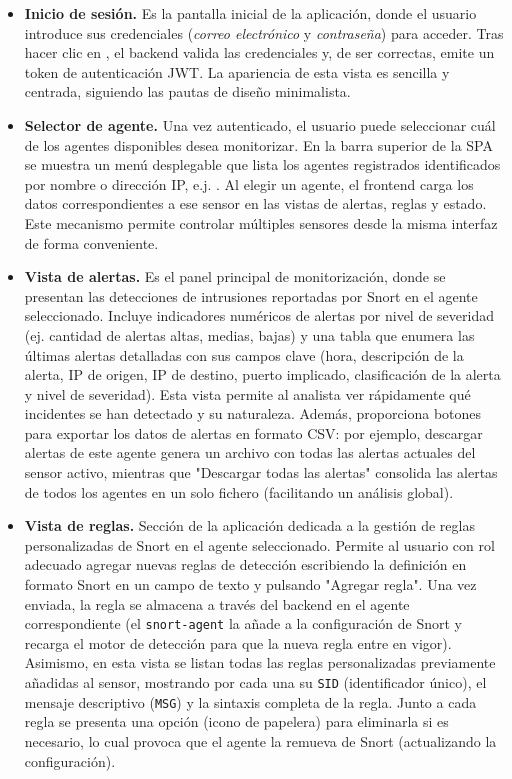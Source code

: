 \documentclass[11pt,a4paper,twoside]{report}
\begin{document}
\begin{itemize}
	\item \textbf{Inicio de sesión.} Es la pantalla inicial de la aplicación, donde el usuario introduce sus credenciales (\emph{correo electrónico} y \emph{contraseña}) para acceder. Tras hacer clic en , el backend valida las credenciales y, de ser correctas, emite un token de autenticación JWT. La apariencia de esta vista es sencilla y centrada, siguiendo las pautas de diseño minimalista.
	
	\item \textbf{Selector de agente.} Una vez autenticado, el usuario puede seleccionar cuál de los agentes disponibles desea monitorizar. En la barra superior de la SPA se muestra un menú desplegable que lista los agentes registrados identificados por nombre o dirección IP, e.j. . Al elegir un agente, el frontend carga los datos correspondientes a ese sensor en las vistas de alertas, reglas y estado. Este mecanismo permite controlar múltiples sensores desde la misma interfaz de forma conveniente.
	
	\item \textbf{Vista de alertas.} Es el panel principal de monitorización, donde se presentan las detecciones de intrusiones reportadas por Snort en el agente seleccionado. Incluye indicadores numéricos de alertas por nivel de severidad (ej. cantidad de alertas altas, medias, bajas) y una tabla que enumera las últimas alertas detalladas con sus campos clave (hora, descripción de la alerta, IP de origen, IP de destino, puerto implicado, clasificación de la alerta y nivel de severidad). Esta vista permite al analista ver rápidamente qué incidentes se han detectado y su naturaleza. Además, proporciona botones para exportar los datos de alertas en formato CSV: por ejemplo, descargar alertas de este agente genera un archivo con todas las alertas actuales del sensor activo, mientras que "Descargar todas las alertas" consolida las alertas de todos los agentes en un solo fichero (facilitando un análisis global).
	
	\item \textbf{Vista de reglas.} Sección de la aplicación dedicada a la gestión de reglas personalizadas de Snort en el agente seleccionado. Permite al usuario con rol adecuado agregar nuevas reglas de detección escribiendo la definición en formato Snort en un campo de texto y pulsando "Agregar regla". Una vez enviada, la regla se almacena a través del backend en el agente correspondiente (el \texttt{snort-agent} la añade a la configuración de Snort y recarga el motor de detección para que la nueva regla entre en vigor). Asimismo, en esta vista se listan todas las reglas personalizadas previamente añadidas al sensor, mostrando por cada una su \texttt{SID} (identificador único), el mensaje descriptivo (\texttt{MSG}) y la sintaxis completa de la regla. Junto a cada regla se presenta una opción (icono de papelera) para eliminarla si es necesario, lo cual provoca que el agente la remueva de Snort (actualizando la configuración).
	

\end{itemize}
\end{document}
